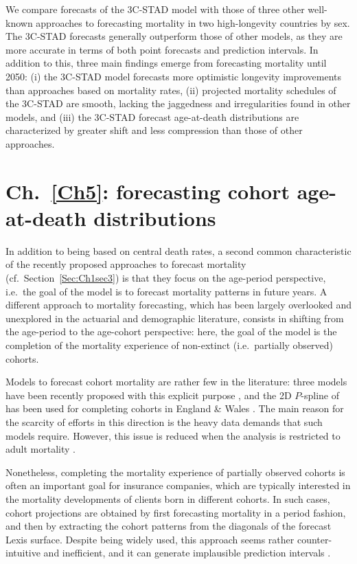 \documentclass[Thesis]{subfiles}
\begin{document}
We compare forecasts of the 3C-STAD model with those of three other well-known approaches to forecasting mortality in two high-longevity countries by sex. The 3C-STAD forecasts generally outperform those of other models, as they are more accurate in terms of both point forecasts and prediction intervals. In addition to this, three main findings emerge from forecasting mortality until 2050: (i)  the 3C-STAD model forecasts more optimistic longevity improvements than approaches based on mortality rates, (ii) projected mortality schedules of the 3C-STAD are smooth, lacking the jaggedness and irregularities found in other models, and (iii) the 3C-STAD forecast age-at-death distributions are characterized by greater shift and less compression than those of other approaches.

\section{Ch.~\ref{Ch5}: forecasting cohort age-at-death distributions}\label{Sec:Ch1sec8}
In addition to being based on central death rates, a second common characteristic of the recently proposed approaches to forecast mortality (cf.~Section~\ref{Sec:Ch1sec3}) is that they focus on the age-period perspective, i.e.~the goal of the model is to forecast mortality patterns in future years. A different approach to mortality forecasting, which has been largely overlooked and unexplored in the actuarial and demographic literature, consists in shifting from the age-period to the age-cohort perspective: here, the goal of the model is the completion of the mortality experience of non-extinct (i.e.~partially observed) cohorts. 

Models to forecast cohort mortality are rather few in the literature: three models have been recently proposed with this explicit purpose \citep{chiou2009modeling,zanotto2017reconstruction,rizzi2019forecasting}, and the 2D $P$-spline of \cite{currie2004smoothing} has been used for completing cohorts in England \& Wales \citep{cmi2007stochastic}. The main reason for the scarcity of efforts in this direction is the heavy data demands that such models require. However, this issue is reduced when the analysis is restricted to adult mortality \citep{booth2006demographic}.

Nonetheless, completing the mortality experience of partially observed cohorts is often an important goal for insurance companies, which are typically interested in the mortality developments of clients born in different cohorts. In such cases, cohort projections are obtained by first forecasting mortality in a period fashion, and then by extracting the cohort patterns from the diagonals of the forecast Lexis surface. Despite being widely used, this approach seems rather counter-intuitive and inefficient, and it can generate implausible prediction intervals \citep{vanraalte2018lifespan}. 
\end{document}
